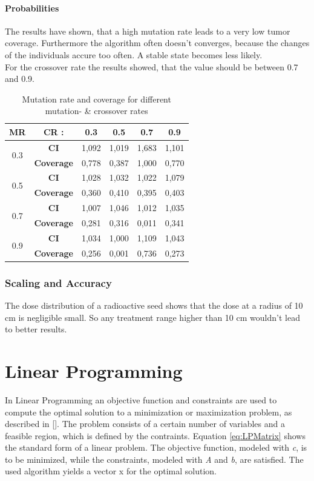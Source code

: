 \documentclass[12pt]{article}
\begin{document}
\newpage
\paragraph{Probabilities} 
The results have shown, that a high mutation rate leads to a very low tumor coverage. Furthermore the algorithm often doesn't converges, because the changes of the individuals accure too often. A stable state becomes less likely. \\ For the crossover rate the results showed, that the value should be between 0.7 and 0.9.
\begin{table}[h]
\label{table:probabilities}
\begin{tabular}{c|ccccc}
\textbf{MR}          & \textbf{CR :}     & 0.3   & 0.5   & 0.7   & 0.9   \\ \hline
\multirow{2}{*}{0.3} & \textbf{CI}       & 1,092 & 1,019 & 1,683 & 1,101 \\
                     & \textbf{Coverage} & 0,778 & 0,387 & 1,000 & 0,770 \\ \hline
\multirow{2}{*}{0.5} & \textbf{CI}       & 1,028 & 1,032 & 1,022 & 1,079 \\
                     & \textbf{Coverage} & 0,360 & 0,410 & 0,395 & 0,403 \\ \hline
\multirow{2}{*}{0.7} & \textbf{CI}       & 1,007 & 1,046 & 1,012 & 1,035 \\
                     & \textbf{Coverage} & 0,281 & 0,316 & 0,011 & 0,341 \\ \hline
\multirow{2}{*}{0.9} & \textbf{CI}       & 1,034 & 1,000 & 1,109 & 1,043 \\
                     & \textbf{Coverage} & 0,256 & 0,001 & 0,736 & 0,273 \\
\end{tabular}
\caption{Mutation rate and coverage for different mutation-  \& crossover rates}

\end{table}
\subsubsection{Scaling and Accuracy}
The dose distribution of a radioactive seed shows that the dose at a radius of 10 cm is negligible small. So any treatment range higher than 10 cm wouldn't lead to better results. 


\section{Linear Programming}
In Linear Programming an objective function and constraints are used to compute the optimal solution to a minimization or maximization problem, as described in [\cite{matprog}]. The problem consists of a certain number of variables and a feasible region, which is defined by the contraints. 
Equation \eqref{eq:LPMatrix} shows the standard form of a linear problem. The objective function, modeled with \textit{c},  is to be minimized, while the constraints, modeled with \textit{A} and \textit{b}, are satisfied. The used algorithm yields a vector x for the optimal solution.
\end{document}
